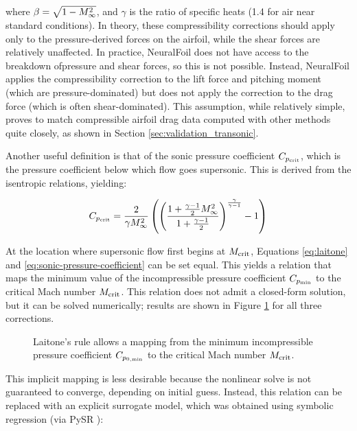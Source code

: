 \documentclass[conf]{new-aiaa}
\begin{document}
    \noindent where $\beta = \sqrt{1- M_\infty^2}$, and $\gamma$ is the ratio of specific heats (1.4 for air near standard conditions). In theory, these compressibility corrections should apply only to the pressure-derived forces on the airfoil, while the shear forces are relatively unaffected. In practice, NeuralFoil does not have access to the breakdown ofpressure and shear forces, so this is not possible. Instead, NeuralFoil applies the compressibility correction to the lift force and pitching moment (which are pressure-dominated) but does not apply the correction to the drag force (which is often shear-dominated). This assumption, while relatively simple, proves to match compressible airfoil drag data computed with other methods quite closely, as shown in Section \ref{sec:validation_transonic}.

    Another useful definition is that of the sonic pressure coefficient $C_{p_{\rm crit}}$, which is the pressure coefficient below which flow goes supersonic. This is derived from the isentropic relations, yielding:

    \begin{equation}
        C_{p_{\rm crit}} = \frac{2}{\gamma M_\infty^{2}} \left(
        \left(
        \frac{1 + \frac{\gamma - 1}{2} M_\infty^{2}}{1 + \frac{\gamma - 1}{2}}
        \right)^{\frac{\gamma}{\gamma - 1}}
        - 1
        \right)
        \label{eq:sonic-pressure-coefficient}
    \end{equation}

    At the location where supersonic flow first begins at $M_{\rm crit}$, Equations \ref{eq:laitone} and \ref{eq:sonic-pressure-coefficient} can be set equal. This yields a relation that maps the minimum value of the incompressible pressure coefficient $C_{p_{\rm min}}$ to the critical Mach number $M_{\rm crit}$. This relation does not admit a closed-form solution, but it can be solved numerically; results are shown in Figure \ref{fig:compressibility_corrections} for all three corrections.

    \begin{figure}[h]
        \centering
        
        \caption{Laitone's rule allows a mapping from the minimum incompressible pressure coefficient $C_{p_{0,\rm min}}$ to the critical Mach number $M_{\rm crit}$.}
        \label{fig:compressibility_corrections}
    \end{figure}

    This implicit mapping is less desirable because the nonlinear solve is not guaranteed to converge, depending on initial guess. Instead, this relation can be replaced with an explicit surrogate model, which was obtained using symbolic regression (via PySR \cite{cranmer_interpretable_2023}):
\end{document}
